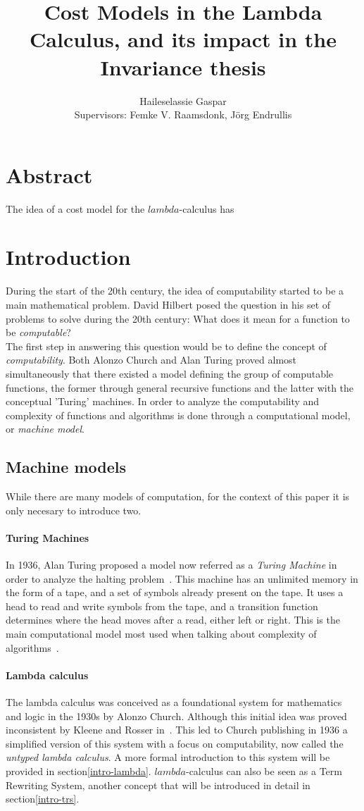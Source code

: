 \documentclass[12pt]{article}
\title{Cost Models in the Lambda Calculus, and its impact in the Invariance thesis}
\author{Haileselassie Gaspar\\[1cm]{\small Supervisors: Femke V. Raamsdonk, Jörg Endrullis}}
\begin{document}
\maketitle

\section{Abstract}\label{abstract}
The idea of a cost model for the $lambda$-calculus has
\section{Introduction}
During the start of the 20th century, the idea of computability started to be a main mathematical problem. David Hilbert posed the question in his set of problems to solve during the 20th century: What does it mean for a function to be \textit{computable}? \\
The first step in answering this question would be to define the concept of \textit{computability}. Both Alonzo Church and Alan Turing proved almost simultaneously that there existed a model defining the group of computable functions, the former through general recursive functions and the latter with the conceptual 'Turing' machines.
In order to analyze the computability and complexity of functions and algorithms is done through a computational model, or \textit{machine model}.
\subsection{Machine models}
While there are many models of computation, for the context of this paper it is only necesary to introduce two.

\paragraph{Turing Machines}
In 1936, Alan Turing proposed a model now referred as a \textit{Turing Machine} in order to analyze the halting problem~\cite{on-computable-numbers}. This machine has an unlimited memory in the form of a tape, and a set of symbols already present on the tape. It uses a head to read and write symbols from the tape, and a transition function determines where the head moves after a read, either left or right. This is the main computational model most used when talking about complexity of algorithms~\cite{computation-theory}.

\paragraph{Lambda calculus}
The lambda calculus was conceived as a foundational system for mathematics and logic in the 1930s by Alonzo Church. Although this initial idea was proved inconsistent by Kleene and Rosser in~\cite{rosser-kleene-inconsistency}. This led to Church publishing in 1936 a simplified version of this system with a focus on computability, now called the \textit{untyped lambda calculus}. A more formal introduction to this system will be provided in section\ref{intro-lambda}. $lambda$-calculus can also be seen as a Term Rewriting System, another concept that will be introduced in detail in section\ref{intro-trs}.
\end{document}
